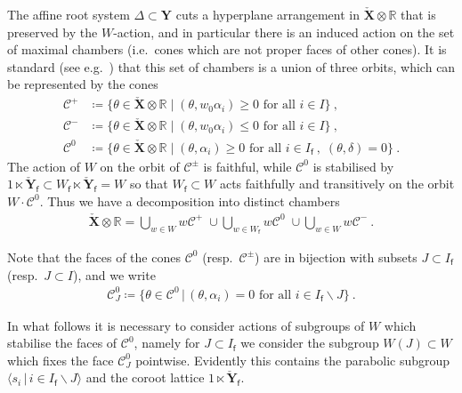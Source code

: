 \documentclass[reqno,a4paper]{amsart}
\newcommand{\calC}{\mathcal{C}}
\newcommand{\R}{\mathbb{R}}
\newcommand{\sff}{\mathsf{f}}
\newcommand{\bfY}{\mathbf{Y}}
\newcommand{\bfX}{\mathbf{X}}
\newcommand{\rootlattice}{\bfY}
\newcommand{\corootlattice}{\check{\bfY}}
\newcommand{\corootlatticefin}{\check{\rootlattice}_\sff}
\newcommand{\weightlattice}{\bfX}
\newcommand{\coweightlattice}{\check{\weightlattice}}
\theoremstyle{basic-theorem}
\numberwithin{equation}{section}
\begin{document}
The affine root system $\Delta\subset \rootlattice$ cuts a hyperplane arrangement in $\coweightlattice\otimes\R$ that is preserved by the $W$-action, and in particular there is an induced action on the set of maximal chambers (i.e.\ cones which are not proper faces of other cones). It is standard (see e.g.\ \cite{Humphreys_Coxeter}) that this set of chambers is a union of three orbits, which can be represented by the cones
\begin{align}
	\calC^+
        &\coloneqq
        \big\{\theta\in \coweightlattice\otimes \R \;\vert\;
            (\theta, w_0\alpha_i) \geq 0 \text{ for all }i\in I\big\}\ , \\
	\calC^-
        &\coloneqq \big\{\theta\in \coweightlattice\otimes \R \;\vert\;
        (\theta, w_0\alpha_i) \leq 0 \text{ for all }i\in I\big\}\ , \\
    \calC^0
        &\coloneqq \big\{\theta\in \coweightlattice\otimes \R \;\vert\;
        (\theta,\alpha_i) \geq 0\text{ for all }i\in I_\sff\ , \;
        (\theta, \delta)=0\big\}\ .
\end{align}
The action of $W$ on the orbit of $\calC^\pm$ is faithful, while $\calC^0$ is stabilised by ${1}\ltimes\corootlattice_\sff\subset W_\sff\ltimes \corootlattice_\sff = W$ so that $W_\sff\subset W$ acts faithfully and transitively on the orbit $W\cdot \calC^0$. Thus we have a decomposition into distinct chambers
\begin{align}\label{eq:titsdecomp}
    \coweightlattice\otimes \R = \bigcup_{w\in W}w\calC^+\; \cup \bigcup_{w\in W_\sff}w\calC^0\; \cup \bigcup_{w\in W}w\calC^-\ .
\end{align}

Note that the faces of the cones $\calC^0$ (resp.\ $\calC^\pm$) are in bijection with subsets $J\subset I_\sff$ (resp.\ $J\subset I$), and we write
\begin{align}
    \calC^0_J\coloneqq\{\theta\in \calC^0\,\vert\, (\theta,\alpha_i) = 0 \text{ for all }i\in I_\sff\smallsetminus J\}\ .
\end{align}

\medskip

In what follows it is necessary to consider actions of subgroups of $W$ which stabilise the faces of $\calC^0$, namely for $J\subset I_\sff$ we consider the subgroup $W(J)\subset W$ which fixes the face $\calC^0_J$ pointwise. Evidently this contains the parabolic subgroup $\langle s_{i}\,\vert\, i\in I_\sff\smallsetminus J\rangle$ and the coroot lattice $1\ltimes \corootlatticefin$.
\end{document}
